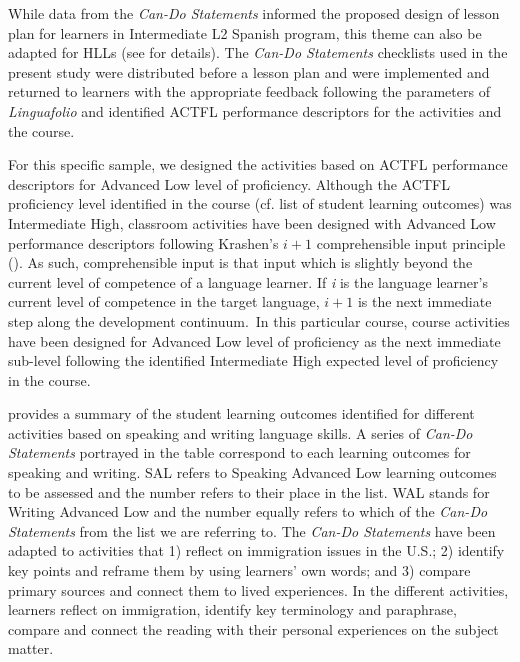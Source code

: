 \documentclass[output=paper]{langscibook}
\begin{document}
While data from the \textit{Can-Do Statements} informed the proposed design of lesson plan for learners in Intermediate L2 Spanish program, this theme can also be adapted for HLLs (see  for details). The \textit{Can-Do Statements} checklists used in the present study were distributed before a lesson plan and were implemented and returned to learners with the appropriate feedback following the parameters of \textit{Linguafolio} and identified ACTFL performance descriptors for the activities and the course.

For this specific sample, we designed the activities based on ACTFL performance descriptors for Advanced Low level of proficiency. Although the ACTFL proficiency level identified in the course (cf. list of student learning outcomes) was Intermediate High, classroom activities have been designed with Advanced Low performance descriptors following Krashen’s $i + 1$ comprehensible input principle (\citealt{Krashen1982,Krashen1985}). As such, comprehensible input is that input which is slightly beyond the current level of competence of a language learner. If \textit{i} is the language learner’s current level of competence in the target language, $i + 1$ is the next immediate step along the development continuum.~In this particular course, course activities have been designed for Advanced Low level of proficiency as the next immediate sub-level following the identified Intermediate High expected level of proficiency in the course.

 provides a summary of the student learning outcomes identified for different activities based on speaking and writing language skills. A series of \textit{Can-Do Statements} portrayed in the table correspond to each learning outcomes for speaking and writing. SAL refers to Speaking Advanced Low learning outcomes to be assessed and the number refers to their place in the list. WAL stands for Writing Advanced Low and the number equally refers to which of the \textit{Can-Do Statements} from the list we are referring to. The \textit{Can-Do Statements} have been adapted to activities that 1) reflect on immigration issues in the U.S.; 2) identify key points and reframe them by using learners' own words; and 3) compare primary sources and connect them to lived experiences. In the different activities, learners reflect on immigration, identify key terminology and paraphrase, compare and connect the reading with their personal experiences on the subject matter.
\end{document}
